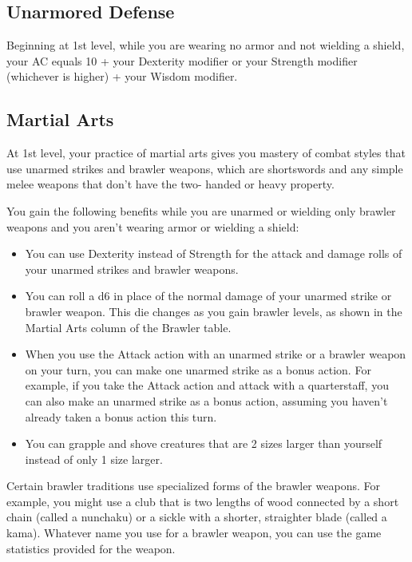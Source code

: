 \subsection{Unarmored Defense}

Beginning at 1st level, while you are wearing no armor and not wielding a shield, your AC equals 10 + your Dexterity modifier or your Strength modifier (whichever is higher) + your Wisdom modifier.

\subsection{Martial Arts}

At 1st level, your practice of martial arts gives you mastery of combat styles that use unarmed strikes and brawler weapons, which are shortswords and any simple melee weapons that don't have the two- handed or heavy property.

You gain the following benefits while you are unarmed or wielding only brawler weapons and you aren't wearing armor or wielding a shield:

\begin{itemize}
\item You can use Dexterity instead of Strength for the attack and damage rolls of your unarmed strikes and brawler weapons.
\item You can roll a d6 in place of the normal damage of your unarmed strike or brawler weapon. This die changes as you gain brawler levels, as shown in the Martial Arts column of the Brawler table.
\item When you use the Attack action with an unarmed strike or a brawler weapon on your turn, you can make one unarmed strike as a bonus action. For example, if you take the Attack action and attack with a quarterstaff, you can also make an unarmed strike as a bonus action, assuming you haven't already taken a bonus action this turn.
\item You can grapple and shove creatures that are 2 sizes larger than yourself instead of only 1 size larger.
\end{itemize}

Certain brawler traditions use specialized forms of the brawler weapons. For example, you might use a club that is two lengths of wood connected by a short chain (called a nunchaku) or a sickle with a shorter, straighter blade (called a kama). Whatever name you use for a brawler weapon, you can use the game statistics provided for the weapon.

